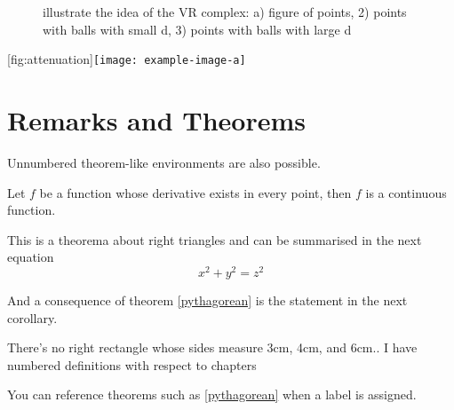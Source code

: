  \begin{figure}[h]
	\begin{whole}
		\caption{illustrate the idea of the VR complex: a) figure of points, 2) points with balls with small d,  3) points with balls with large d}
		\label{fig:vr_complex}
	\end{whole}	
\end{figure}




[fig:attenuation]{\texttt{[image: example-image-a]}}


\section{Remarks and Theorems}
Unnumbered theorem-like  environments are also possible.

\begin{theorem}
Let $f$ be a function whose derivative exists in every point, then $f$ is 
a continuous function.
\end{theorem}

\begin{theorem}
\label{pythagorean}
This is a theorema about right triangles and can be summarised in the next 
equation 
\[ x^2 + y^2 = z^2 \]
\end{theorem}

And a consequence of theorem \ref{pythagorean} is the statement in the next 
corollary.

\begin{definition}
There's no right rectangle whose sides measure 3cm, 4cm, and 6cm..
I have numbered definitions with respect to chapters
\end{definition}

You can reference theorems such as \ref{pythagorean} when a label is assigned.


